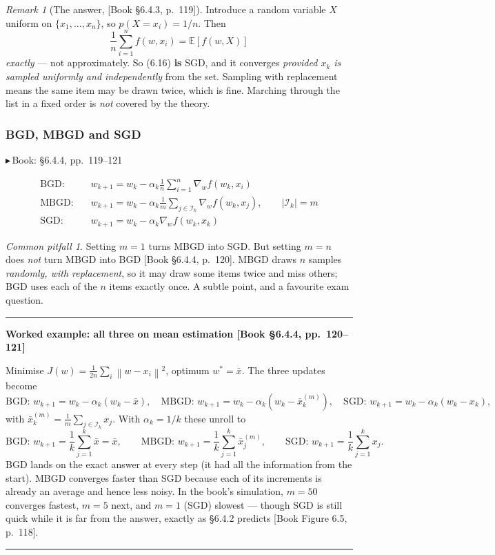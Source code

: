 \documentclass[11pt, letterpaper]{article}
\theoremstyle{runin}
\theoremstyle{runinplain}
\theoremstyle{remark}
\newtheorem*{remark}{Remark}
\newtheorem*{warning}{Common pitfall}
\newcommand{\E}{\mathbb{E}}
\newcommand{\norm}[1]{\left\lVert #1 \right\rVert}
\newcommand{\bk}[1]{{\color{bookblue}\small$\blacktriangleright$\,\textsf{Book: #1}}}
\newcommand{\bkin}[1]{{\color{bookblue}\small[\textsf{Book #1}]}}
\newenvironment{worked}[1]
  {\par\medskip\noindent\rule{\textwidth}{0.4pt}\par\nobreak\vspace{0.3em}
   \noindent\textbf{Worked example: #1}\par\nobreak\vspace{0.2em}\small}
  {\par\nobreak\vspace{0.3em}\noindent\rule{\textwidth}{0.4pt}\par\medskip}
\begin{document}
\begin{remark}[The answer, \bkin{\S6.4.3, p.~119}]
Introduce a random variable $X$ uniform on $\{x_1,\dots,x_n\}$, so $p(X=x_i)=1/n$.
Then
\[
  \frac1n\sum_{i=1}^n f(w,x_i)=\E[f(w,X)]
\]
\emph{exactly} --- not approximately. So (6.16) \textbf{is} SGD, and it converges
\emph{provided $x_k$ is sampled uniformly and independently} from the set. Sampling
with replacement means the same item may be drawn twice, which is fine. Marching
through the list in a fixed order is \emph{not} covered by the theory.
\end{remark}

\subsubsection{BGD, MBGD and SGD}

\bk{\S6.4.4, pp.~119--121}

\[
\begin{aligned}
  \text{BGD:}\quad & w_{k+1}=w_k-\alpha_k\frac1n\sum_{i=1}^n\nabla_wf(w_k,x_i)\\
  \text{MBGD:}\quad& w_{k+1}=w_k-\alpha_k\frac1m\sum_{j\in\mathcal I_k}\nabla_wf(w_k,x_j),
                     \qquad |\mathcal I_k|=m\\
  \text{SGD:}\quad & w_{k+1}=w_k-\alpha_k\nabla_wf(w_k,x_k)
\end{aligned}
\]

\begin{warning}
Setting $m=1$ turns MBGD into SGD. But setting $m=n$ does \emph{not} turn MBGD into
BGD \bkin{\S6.4.4, p.~120}. MBGD draws $n$ samples \emph{randomly, with
replacement}, so it may draw some items twice and miss others; BGD uses each of the
$n$ items exactly once. A subtle point, and a favourite exam question.
\end{warning}

\begin{worked}{all three on mean estimation \bkin{\S6.4.4, pp.~120--121}}
Minimise $J(w)=\frac{1}{2n}\sum_i\norm{w-x_i}^2$, optimum $w^*=\bar x$. The three
updates become
\[
  \text{BGD: } w_{k+1}=w_k-\alpha_k(w_k-\bar x),\quad
  \text{MBGD: } w_{k+1}=w_k-\alpha_k(w_k-\bar x_k^{(m)}),\quad
  \text{SGD: } w_{k+1}=w_k-\alpha_k(w_k-x_k),
\]
with $\bar x_k^{(m)}=\frac1m\sum_{j\in\mathcal I_k}x_j$. With $\alpha_k=1/k$ these
unroll to
\[
  \text{BGD: } w_{k+1}=\frac1k\sum_{j=1}^k\bar x=\bar x,\qquad
  \text{MBGD: } w_{k+1}=\frac1k\sum_{j=1}^k\bar x_j^{(m)},\qquad
  \text{SGD: } w_{k+1}=\frac1k\sum_{j=1}^k x_j .
\]
BGD lands on the exact answer at every step (it had all the information from the
start). MBGD converges faster than SGD because each of its increments is already an
average and hence less noisy. In the book's simulation, $m=50$ converges fastest,
$m=5$ next, and $m=1$ (SGD) slowest --- though SGD is still quick while it is far
from the answer, exactly as \S6.4.2 predicts \bkin{Figure 6.5, p.~118}.
\end{worked}
\end{document}
